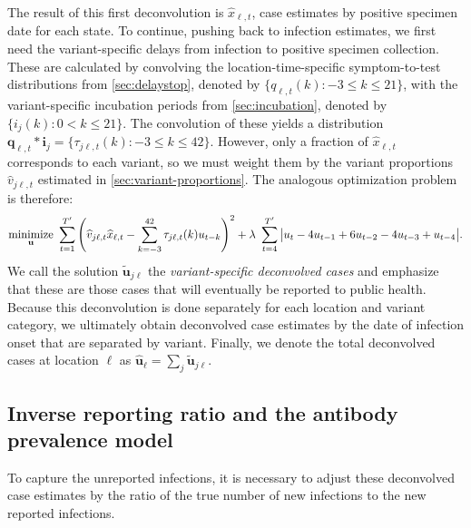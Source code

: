 The result of this first deconvolution is $\widehat{x}_{\ell,t}$, case estimates
by positive specimen date for each state. To continue, pushing back to infection
estimates, we first need the variant-specific delays from infection to positive
specimen collection. These are calculated by convolving the
location-time-specific symptom-to-test distributions from
\autoref{sec:delaystop}, denoted by $\{q_{\ell,t}(k) : -3\leq k \leq 21\}$, with
the variant-specific incubation periods from \autoref{sec:incubation}, denoted
by $\{i_{j}(k) : 0 < k \leq 21\}$. The convolution of these yields a
distribution $\mathbf{q}_{\ell,t}*\mathbf{i}_j = \{\tau_{j\ell,t}(k): -3 \leq k
\leq 42\}$. However, only a fraction of $\widehat{x}_{\ell,t}$ corresponds to
each variant, so we must weight them by the variant proportions
$\widehat{v}_{j\ell,t}$ estimated in \autoref{sec:variant-proportions}. The
analogous optimization problem is therefore:
\begin{align}
\operatorname*{minimize}_{\mathbf{u}}\ \sum_{t=1}^{T'} 
\left( 
    \widehat{v}_{j\ell,t}\widehat{x}_{\ell,t} -  
    \sum_{k=-3}^{42} \tau_{j\ell,t}(k) u_{t-k} 
\right)^2 
+ \lambda\ \sum_{t=4}^{T'} \big|u_{t} - 4u_{t-1} + 6u_{t-2} -4u_{t-3}+ u_{t-4}\big|.
\end{align}
We call the solution $\widetilde{\mathbf{u}}_{j\ell}$ the \emph{variant-specific
deconvolved cases} and emphasize that these are those cases that will eventually
be reported to public health. Because this deconvolution is done separately for
each location and variant category, we ultimately obtain deconvolved case
estimates by the date of infection onset that are separated by variant. Finally,
we denote the total deconvolved cases at location $\ell$ as
$\widehat{\mathbf{u}}_\ell = \sum_j \widetilde{\mathbf{u}}_{j\ell}$. 

\subsection{Inverse reporting ratio and the antibody prevalence model} 
\label{sec:report-ratio}

To capture the unreported infections, it is necessary to adjust these
deconvolved case estimates by the ratio of the true number of new infections to
the new reported infections. 

